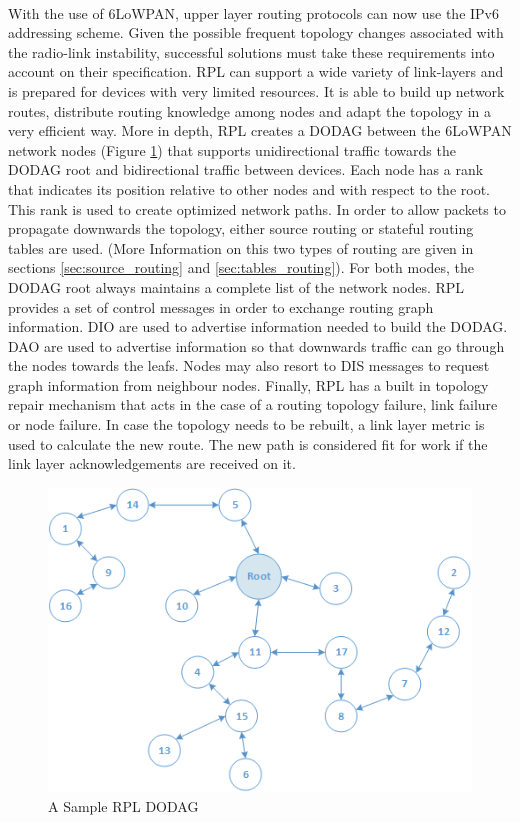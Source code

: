 \paragraph{}
With the use of 6LoWPAN, upper layer routing protocols can now use the IPv6 addressing scheme. Given the possible frequent topology changes associated with the radio-link instability, successful  solutions must take these requirements into account on their specification. RPL can support a wide variety of link-layers and is prepared for devices with very limited resources. It is able to build up network routes, distribute routing knowledge among nodes and adapt the topology in a very efficient way. More in depth, RPL creates a \ac{DODAG} between the 6LoWPAN network nodes (Figure \ref{fig:rpl_dodag}) that supports unidirectional traffic towards the \ac{DODAG} root and bidirectional traffic between devices. Each node has a rank that indicates its position relative to other nodes and with respect to the root. This rank is used to create optimized network paths. In order to allow packets to propagate downwards the topology, either source routing or stateful routing tables are used. (More Information on this two types of routing are given in sections \ref{sec:source_routing} and \ref{sec:tables_routing}). For both modes, the \ac{DODAG} root always maintains a complete list of the network nodes. RPL provides a set of control messages in order to exchange routing graph information. \ac{DIO} are used to advertise information needed to build the \ac{DODAG}. \ac{DAO}  are used to advertise information so that downwards traffic can go through the nodes towards the leafs. Nodes may also resort to \ac{DIS} messages to request graph information from neighbour nodes. Finally, RPL has a built in topology repair mechanism that acts in the case of a routing topology failure, link failure or node failure. In case the topology needs to be rebuilt, a link layer metric is used to calculate the new route. The new path is considered fit for work if the link layer acknowledgements are received on it.

\begin{figure}[h]
  \centering
  \includegraphics[width=0.8\linewidth]{figures/RPL_DODAG.png}
  \caption{A Sample RPL DODAG}
  \label{fig:rpl_dodag}
\end{figure}

